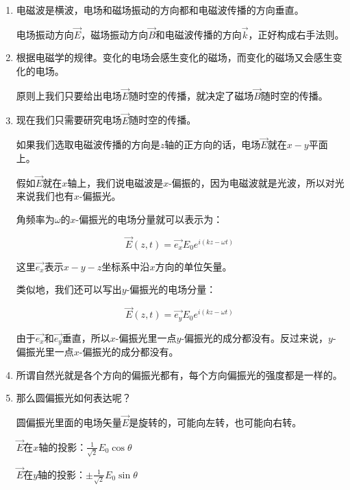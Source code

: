 \begin{enumerate}
\item 

电磁波是横波，电场和磁场振动的方向都和电磁波传播的方向垂直。

电场振动方向$\vec E$，磁场振动方向$\vec B$和电磁波传播的方向$\vec k$，正好构成右手法则。

\item 

根据电磁学的规律。变化的电场会感生变化的磁场，而变化的磁场又会感生变化的电场。

原则上我们只要给出电场$\vec E$随时空的传播，就决定了磁场$\vec B$随时空的传播。

\item

现在我们只需要研究电场$\vec E$随时空的传播。

如果我们选取电磁波传播的方向是$z$轴的正方向的话，电场$\vec E$就在$x-y$平面上。

假如$\vec E$就在$x$轴上，我们说电磁波是$x$-偏振的，因为电磁波就是光波，所以对光来说我们也有$x$-偏振光。

角频率为$\omega$的$x$-偏振光的电场分量就可以表示为：

\begin{equation}
\vec E (z, t) = \vec {e_x} E_0 e^{i ( kz - \omega t ) }~ 
\end{equation}

这里$\vec {e_x}$表示$x-y-z$坐标系中沿$x$方向的单位矢量。

类似地，我们还可以写出$y$-偏振光的电场分量：

\begin{equation}
\vec E (z, t) = \vec {e_y} E_0 e^{i ( kz - \omega t ) }~ 
\end{equation}

由于$\vec {e_x}$和$\vec {e_y}$垂直，所以$x$-偏振光里一点$y$-偏振光的成分都没有。反过来说，$y$-偏振光里一点$x$-偏振光的成分都没有。

\item

所谓自然光就是各个方向的偏振光都有，每个方向偏振光的强度都是一样的。

\item

那么圆偏振光如何表达呢？

圆偏振光里面的电场矢量$\vec E$是旋转的，可能向左转，也可能向右转。

$\vec E$在$x$轴的投影：$ \frac{1}{\sqrt{2}} E_0 \cos \theta$

$\vec E$在$y$轴的投影：$ \pm  \frac{1}{\sqrt{2}} E_0 \sin \theta$


\end{enumerate}
